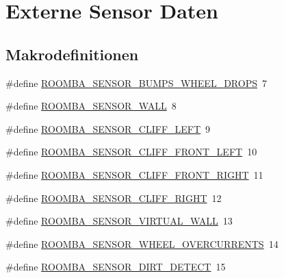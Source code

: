 \hypertarget{group__roomba__sensor__extern}{\section{Externe Sensor Daten}
\label{group__roomba__sensor__extern}
}
\subsection*{Makrodefinitionen}
\begin{DoxyCompactItemize}
\item 
\#define \hyperlink{group__roomba__sensor__extern_ga52d4985b7063d9a96315c241657620a3}{R\-O\-O\-M\-B\-A\-\_\-\-S\-E\-N\-S\-O\-R\-\_\-\-B\-U\-M\-P\-S\-\_\-\-W\-H\-E\-E\-L\-\_\-\-D\-R\-O\-P\-S}~7
\item 
\#define \hyperlink{group__roomba__sensor__extern_ga5398879cecaf2fcfb997b4e3cba53f88}{R\-O\-O\-M\-B\-A\-\_\-\-S\-E\-N\-S\-O\-R\-\_\-\-W\-A\-L\-L}~8
\item 
\#define \hyperlink{group__roomba__sensor__extern_ga6bad74dea95ee3a2f527377b59015828}{R\-O\-O\-M\-B\-A\-\_\-\-S\-E\-N\-S\-O\-R\-\_\-\-C\-L\-I\-F\-F\-\_\-\-L\-E\-F\-T}~9
\item 
\#define \hyperlink{group__roomba__sensor__extern_ga81f46b587fc2bb45de93f8120dc400fc}{R\-O\-O\-M\-B\-A\-\_\-\-S\-E\-N\-S\-O\-R\-\_\-\-C\-L\-I\-F\-F\-\_\-\-F\-R\-O\-N\-T\-\_\-\-L\-E\-F\-T}~10
\item 
\#define \hyperlink{group__roomba__sensor__extern_ga03cb42b133db401142781a61d2b890a3}{R\-O\-O\-M\-B\-A\-\_\-\-S\-E\-N\-S\-O\-R\-\_\-\-C\-L\-I\-F\-F\-\_\-\-F\-R\-O\-N\-T\-\_\-\-R\-I\-G\-H\-T}~11
\item 
\#define \hyperlink{group__roomba__sensor__extern_ga6c983bf658c05be9c4200c3c81367765}{R\-O\-O\-M\-B\-A\-\_\-\-S\-E\-N\-S\-O\-R\-\_\-\-C\-L\-I\-F\-F\-\_\-\-R\-I\-G\-H\-T}~12
\item 
\#define \hyperlink{group__roomba__sensor__extern_ga19246309d8a1e5f64cb634a6b54a40da}{R\-O\-O\-M\-B\-A\-\_\-\-S\-E\-N\-S\-O\-R\-\_\-\-V\-I\-R\-T\-U\-A\-L\-\_\-\-W\-A\-L\-L}~13
\item 
\#define \hyperlink{group__roomba__sensor__extern_gac75ea0b65c42e3d5743e942051b8bdd0}{R\-O\-O\-M\-B\-A\-\_\-\-S\-E\-N\-S\-O\-R\-\_\-\-W\-H\-E\-E\-L\-\_\-\-O\-V\-E\-R\-C\-U\-R\-R\-E\-N\-T\-S}~14
\item 
\#define \hyperlink{group__roomba__sensor__extern_ga9edadcd2d5f80a64cea9464c352ee620}{R\-O\-O\-M\-B\-A\-\_\-\-S\-E\-N\-S\-O\-R\-\_\-\-D\-I\-R\-T\-\_\-\-D\-E\-T\-E\-C\-T}~15

\end{DoxyCompactItemize}
